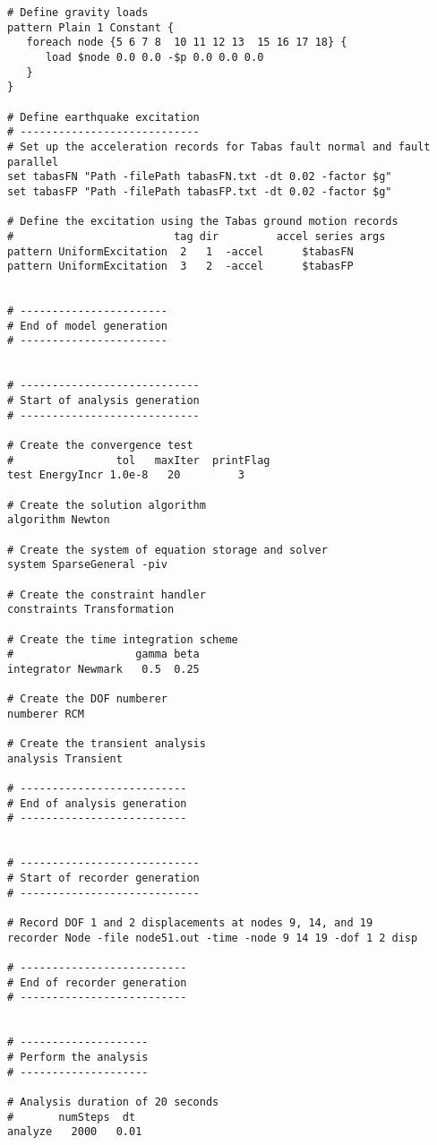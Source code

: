 \documentclass[12pt]{article}
\begin{document}
{\begin{verbatim}
# Define gravity loads
pattern Plain 1 Constant {
   foreach node {5 6 7 8  10 11 12 13  15 16 17 18} {
      load $node 0.0 0.0 -$p 0.0 0.0 0.0
   }
}

# Define earthquake excitation
# ----------------------------
# Set up the acceleration records for Tabas fault normal and fault parallel
set tabasFN "Path -filePath tabasFN.txt -dt 0.02 -factor $g"
set tabasFP "Path -filePath tabasFP.txt -dt 0.02 -factor $g"

# Define the excitation using the Tabas ground motion records
#                         tag dir         accel series args
pattern UniformExcitation  2   1  -accel      $tabasFN
pattern UniformExcitation  3   2  -accel      $tabasFP


# ----------------------- 
# End of model generation
# -----------------------


# ----------------------------
# Start of analysis generation
# ----------------------------

# Create the convergence test
#                tol   maxIter  printFlag
test EnergyIncr 1.0e-8   20         3

# Create the solution algorithm
algorithm Newton

# Create the system of equation storage and solver
system SparseGeneral -piv

# Create the constraint handler
constraints Transformation

# Create the time integration scheme
#                   gamma beta
integrator Newmark   0.5  0.25

# Create the DOF numberer
numberer RCM

# Create the transient analysis
analysis Transient

# --------------------------
# End of analysis generation
# --------------------------


# ----------------------------
# Start of recorder generation
# ----------------------------

# Record DOF 1 and 2 displacements at nodes 9, 14, and 19
recorder Node -file node51.out -time -node 9 14 19 -dof 1 2 disp

# --------------------------
# End of recorder generation
# --------------------------


# --------------------
# Perform the analysis
# --------------------

# Analysis duration of 20 seconds
#       numSteps  dt
analyze   2000   0.01
\end{verbatim}
}
\end{document}
